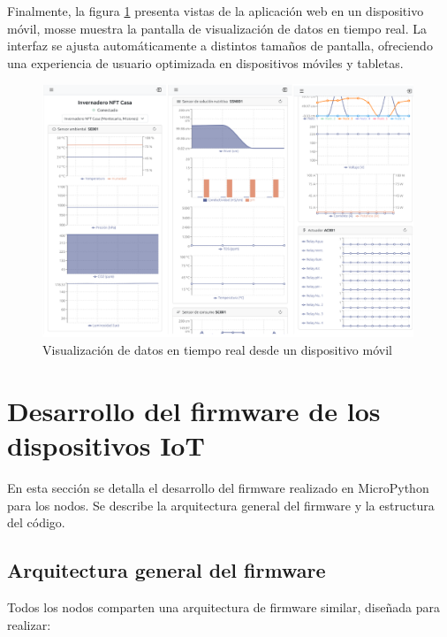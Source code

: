 Finalmente, la figura \ref{fig:dashboar_celular} presenta vistas de la
aplicación web en un dispositivo móvil, mosse muestra la pantalla de
visualización de datos en tiempo real. La interfaz se ajusta automáticamente a
distintos tamaños de pantalla, ofreciendo una experiencia de usuario optimizada
en dispositivos móviles y tabletas.

\begin{figure}[H]
    \centering
    \includegraphics[width=0.99\textwidth]{./Images/29_dashboard_celular.png}
    \caption{Visualización de datos en tiempo real desde un dispositivo móvil}
    \label{fig:dashboar_celular}
\end{figure}

\section{Desarrollo del firmware de los dispositivos IoT}

En esta sección se detalla el desarrollo del firmware realizado en MicroPython
para los nodos. Se describe la arquitectura general del firmware y la
estructura del código.

\subsection{Arquitectura general del firmware}

Todos los nodos comparten una arquitectura de firmware similar, diseñada para
realizar:

